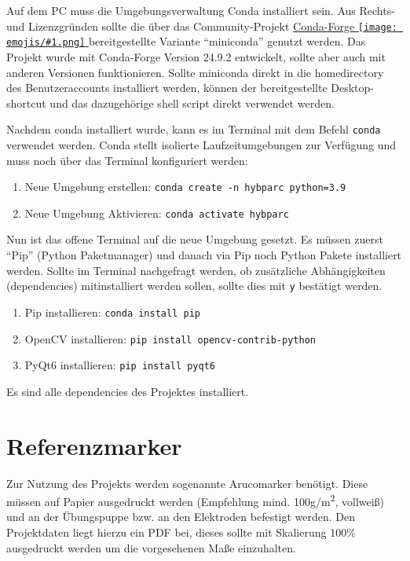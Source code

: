 \documentclass[a4paper, 10pt]{article}
\newcommand{\code}[1]{\texttt{#1}}
\newcommand{\emoji}[1]{
    \begingroup\normalfont
    \texttt{[image: emojis/\#1.png]}
    \endgroup
}
\begin{document}
Auf dem PC muss die Umgebungsverwaltung Conda installiert sein. Aus Rechts- und Lizenzgründen sollte die über das Community-Projekt \href{https://conda-forge.org/}{Conda-Forge\emoji{link}} bereitgestellte Variante \enquote{miniconda} genutzt werden. Das Projekt wurde mit Conda-Forge Version 24.9.2 entwickelt, sollte aber auch mit anderen Versionen funktionieren. Sollte miniconda direkt in die homedirectory des Benutzeraccounts installiert werden, können der bereitgestellte Desktop-shortcut und das dazugehörige shell script direkt verwendet werden.

Nachdem conda installiert wurde, kann es im Terminal mit dem Befehl \code{conda} verwendet werden. Conda stellt isolierte Laufzeitumgebungen zur Verfügung und muss noch über das Terminal konfiguriert werden:
\begin{enumerate}
    \item Neue Umgebung erstellen: \code{conda create -n hybparc python=3.9}
    \item Neue Umgebung Aktivieren: \code{conda activate hybparc}
\end{enumerate}

Nun ist das offene Terminal auf die neue Umgebung gesetzt. Es müssen zuerst \enquote{Pip} (Python Paketmanager) und danach via Pip noch Python Pakete installiert werden. Sollte im Terminal nachgefragt werden, ob zusätzliche Abhängigkeiten (dependencies) mitinstalliert werden sollen, sollte dies mit \code{y} bestätigt werden.

\begin{enumerate}
    \item Pip installieren: \code{conda install pip}
    \item OpenCV installieren: \code{pip install opencv-contrib-python}
    \item PyQt6 installieren: \code{pip install pyqt6}
\end{enumerate}

Es sind alle dependencies des Projektes installiert.

\section{Referenzmarker}
\label{sec:ref-markers}
Zur Nutzung des Projekts werden sogenannte Arucomarker benötigt. Diese müssen auf Papier ausgedruckt werden (Empfehlung mind. 100g/m\textsuperscript{2}, vollweiß) und an der Übungspuppe bzw. an den Elektroden befestigt werden. Den Projektdaten liegt hierzu ein PDF bei, dieses sollte mit Skalierung 100\% ausgedruckt werden um die vorgesehenen Maße einzuhalten.
\end{document}
